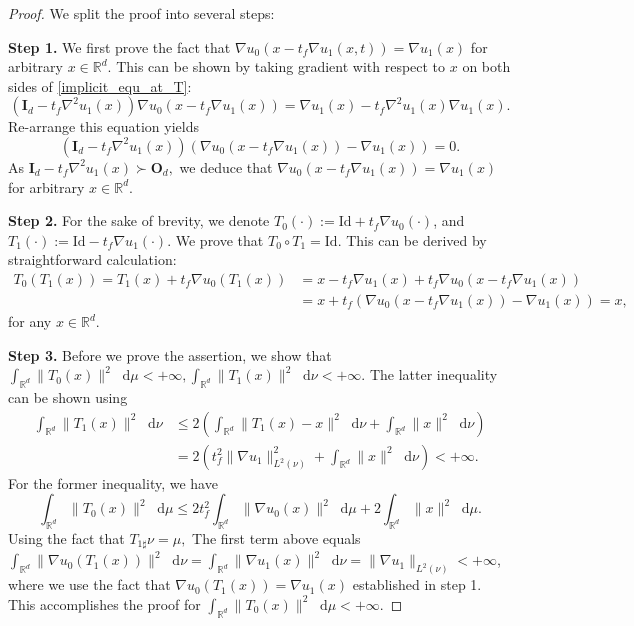 \documentclass[10pt,a4paper]{amsart}
\newcommand*\diff{\mathop{}\!\mathrm{d}}
\begin{document}
\begin{proof}
We split the proof into several steps:

\textbf{Step 1.} We first prove the fact that $\nabla u_0(x - t_f\nabla u_1(x, t)) = \nabla u_1(x)$ for arbitrary $x\in\mathbb{R}^d$. This can be shown by taking gradient with respect to $x$ on both sides of \eqref{implicit_equ_at_T}:
\begin{equation*}
  (\textbf{I}_d - t_f\nabla^2 u_1(x)) \nabla u_0(x - t_f \nabla u_1(x)) = \nabla u_1(x) - t_f \nabla^2 u_1(x) \nabla u_1(x).
\end{equation*}
Re-arrange this equation yields
\begin{equation*}
  (\textbf{I}_d -t_f\nabla^2 u_1(x)) (\nabla u_0(x - t_f \nabla u_1(x)) - \nabla u_1(x)) = 0.
\end{equation*}
As $\textbf{I}_d-t_f\nabla^2 u_1(x)\succ \textbf{O}_d,$ we deduce that $\nabla u_0(x - t_f \nabla u_1(x)) = \nabla u_1(x)$ for arbitrary $x\in\mathbb{R}^d$.

\textbf{Step 2.} For the sake of brevity, we denote  $T_0(\cdot):=\mathrm{Id} + t_f \nabla u_0(\cdot)$, and $T_1(\cdot):=\mathrm{Id} - t_f\nabla u_1(\cdot)$. We prove that $T_0\circ T_1 = \mathrm{Id}$. This can be derived by straightforward calculation:
\begin{align*}
  T_0(T_1(x)) = T_1(x) + t_f\nabla u_0(T_1(x)) & =  x - t_f \nabla u_1(x) + t_f\nabla u_0(x - t_f \nabla u_1(x))  \\
  & = x + t_f(\nabla u_0(x - t_f \nabla u_1(x)) - \nabla u_1(x)) = x,
\end{align*}
for any $x \in \mathbb{R}^d$.

\textbf{Step 3.} Before we prove the assertion, we show that $\int_{\mathbb{R}^d} \|T_0(x)\|^2 \diff \mu < +\infty, \int_{\mathbb{R}^d} \|T_1(x)\|^2 \diff \nu < +\infty.$ The latter inequality can be shown using
\begin{align*}
  \int_{\mathbb{R}^d} \|T_1(x)\|^2 \diff \nu & \leq  2\left(\int_{\mathbb{R}^d} \|T_1(x) - x\|^2 \diff \nu + \int_{\mathbb{R}^d} \|x\|^2 \diff \nu\right) \\
  & =  2(t_f^2\|\nabla u_1\|_{L^2(\nu)}^2 + \int_{\mathbb{R}^d} \|x\|^2 \diff \nu) < +\infty.
\end{align*}
For the former inequality, we have
\begin{equation*}
  \int_{\mathbb{R}^d} \|T_0(x)\|^2 \diff \mu \leq %
  2 t_f^2\int_{\mathbb{R}^d} \|\nabla u_0(x)\|^2 \diff \mu + 2 \int_{\mathbb{R}^d} \|x\|^2 \diff \mu.
\end{equation*}
Using the fact that $T_{1\sharp}\nu = \mu,$ The first term above equals $\int_{\mathbb{R}^d} \|\nabla u_0(T_1(x))\|^2\diff \nu = \int_{\mathbb{R}^d} \|\nabla u_1(x)\|^2\diff \nu = \|\nabla u_1\|_{L^2(\nu)}<+\infty$, where we use the fact that $\nabla u_0(T_1(x)) = \nabla u_1(x)$ established in step 1. This accomplishes the proof for $\int_{\mathbb{R}^d} \|T_0(x)\|^2 \diff \mu < + \infty$.


\end{proof}
\end{document}
